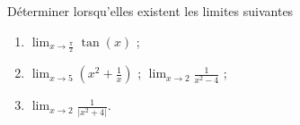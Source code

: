 
\begin{exercice}\label{exoSVT-0002}

    Déterminer lorsqu'elles existent les limites suivantes
    \begin{enumerate}
            
        \item
          $\displaystyle \lim_{x\to \frac{\pi}{2}}\tan(x)$ ;
          \item
            $\displaystyle \lim_{x\to 5}\left(x^2+\frac{1}{x}\right)$ ;
                  $\displaystyle \lim_{x\to 2}\frac{1}{x^2-4}$ ;
                  \item
                    $\displaystyle \lim_{x\to 2}\frac{1}{|x^2+4|}$.
    \end{enumerate}

\end{exercice}
